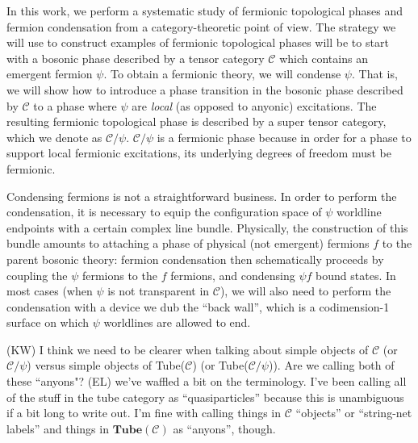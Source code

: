 \documentclass[12pt,a4paper]{article}
\newcommand{\mcc}{\mathcal{C}}
\newcommand{\tube}{\textbf{Tube}}
\newcommand{\kw}[1]{{\color{kwcolor}\footnotesize{(KW) #1}}}
\newcommand{\ethan}[1]{{\color{amethyst}\footnotesize{(EL) #1}}}
\begin{document}
In this work, we perform a systematic study of fermionic topological phases and fermion condensation from a category-theoretic
point of view. 
The strategy we will use to construct examples of fermionic topological phases will be to start with 
a bosonic phase described by a tensor category $\mcc$
which contains an emergent fermion $\psi$.
To obtain a fermionic theory, we will condense $\psi$.
That is, we will show how to introduce a phase transition in the bosonic phase 
described by $\mcc$ to a phase where $\psi$ are {\it local} (as opposed to anyonic) excitations.
The resulting fermionic topological phase is described by a super tensor category, which we denote
as $\mcc / \psi$.
$\mcc/\psi$ is a fermionic phase because in order for a phase to support local fermionic excitations, 
its underlying degrees of freedom must be fermionic. 

Condensing fermions is not a straightforward business. 
In order to perform the condensation, it is necessary to equip the configuration 
space of $\psi$ worldline endpoints with a certain complex line bundle. 
Physically, the construction of this bundle amounts to attaching a phase of physical (not emergent) fermions $f$ 
to the parent bosonic theory: 
fermion condensation then schematically proceeds by coupling the $\psi$ fermions to 
the $f$ fermions, and condensing $\psi f$ bound states. 
In most cases (when $\psi$ is not transparent in $\mcc$), we will also need to perform 
the condensation with a device we dub the ``back wall'', which is a codimension-1 surface 
on which $\psi$ worldlines are allowed to end. 

\kw{I think we need to be clearer when talking about simple objects of $\mcc$ (or $\mcc/\psi$)
versus simple objects of Tube($\mcc$) (or Tube($\mcc/\psi$)).
Are we calling both of these ``anyons"?}
\ethan{we've waffled a bit on the terminology. I've been calling all of the stuff in the tube category as ``quasiparticles'' because this is unambiguous if a bit long to write out. I'm fine with calling things in $\mcc$ ``objects'' or ``string-net labels'' and things in $\tube(\mcc)$ as ``anyons'', though.}
\end{document}
